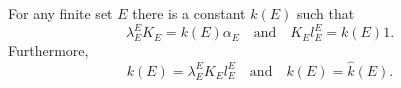 For any finite set $E$ there is a constant $k(E)$ such that
$$\lambda_E^E K_E = k(E) \alpha_E \quad \text{and} \quad K_E l_E^E = k(E) 1.$$
Furthermore,
$$k(E) = \lambda_E^E K_E l_E^E \quad \text{and} \quad k(E) = \hat{k}(E).$$
